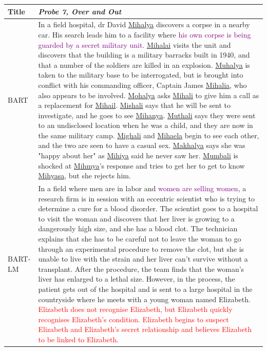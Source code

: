 \documentclass[11pt]{article}
\begin{document}
\begin{table}[t!]
    \centering
    \small
    \begin{tabularx}{2\columnwidth}{l|X}
    \toprule[1pt]
    Title & \textit{Probe 7, Over and Out} \\
    \midrule[0.5pt]
    {BART} & In a field hospital, dr David \underline{Mihalya} discovers a corpse in a nearby car. 
His search leads him to a facility where \textcolor{purple}{his own corpse is being guarded by a secret military unit.} 
\underline{Mihalai} visits the unit and discovers that the building is a military barracks built in 1940, and that a number of the soldiers are killed in an explosion. 
\underline{Muhalya} is taken to the military base to be interrogated, but is brought into conflict with his commanding officer, Captain James \underline{Mihalia}, who also appears to be involved. 
\underline{Mohalya} asks \underline{Mihali} to give him a call as a replacement for \underline{Mihail}. 
\underline{Mishali} says that he will be sent to investigate, and he goes to see \underline{Mihanya}. 
\underline{Muthali} says they were sent to an undisclosed location when he was a child, and they are now in the same military camp. 
\underline{Mighali} and \underline{Mihaela} begin to see each other, and the two are seen to have a casual sex. 
\underline{Makhalya} says she was "happy about her" as \underline{Mihiya} said he never saw her. 
\underline{Mumbali} is shocked at \underline{Mihmya}'s response and tries to get her to get to know \underline{Mihyasa}, but she rejects him. \\
    \midrule[0.5pt]
    {BART-LM} & In a field where men are in labor and \textcolor{purple}{women are selling women}, a research firm is in session with an eccentric scientist who is trying to determine a cure for a blood disorder. 
The scientist goes to a hospital to visit the woman and discovers that her liver is growing to a dangerously high size, and she has a blood clot. 
The technician explains that she has to be careful not to leave the woman to go through an experimental procedure to remove the clot, but she is unable to live with the strain and her liver can't survive without a transplant. 
After the procedure, the team finds that the woman's liver has enlarged to a lethal size. 
However, in the process, the patient gets out of the hospital and is sent to a large hospital in the countryside where he meets with a young woman named Elizabeth. \textcolor{red}{Elizabeth does not recognise Elizabeth, but Elizabeth quickly recognises Elizabeth's condition. Elizabeth begins to suspect Elizabeth and Elizabeth's secret relationship and believes Elizabeth to be linked to Elizabeth.}\\

\end{tabularx}
\end{table}
\end{document}
